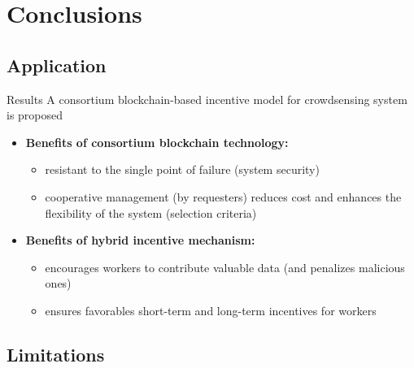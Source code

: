 

\section{Conclusions}

\subsection{Application}

\begin{frame}{Results}
	A consortium blockchain-based incentive model for crowdsensing system is
proposed
  \begin{itemize}
  \item \textbf{Benefits of consortium blockchain technology:} 
  	\begin{itemize}
  		\item resistant to the single point of failure (system security)
  		\item cooperative management (by requesters) reduces cost and enhances the flexibility of the system (selection criteria)
  	\end{itemize}
  \item \textbf{Benefits of hybrid incentive mechanism:}
  	\begin{itemize}
  		\item encourages workers to contribute valuable data (and penalizes malicious ones)
  		\item ensures favorables short-term and long-term incentives for workers
  	\end{itemize}
  \end{itemize}
\end{frame}


\subsection{Limitations}

